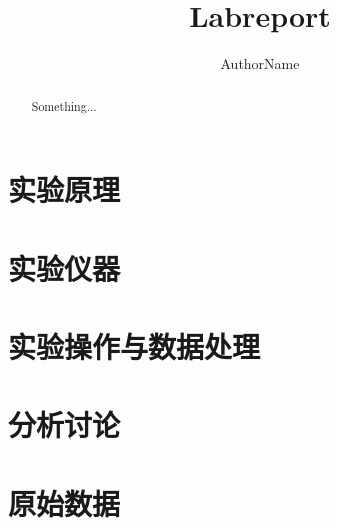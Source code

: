 \documentclass[UTF-8]{ctexart}
\title{Labreport}
\author{AuthorName}
\begin{document}
\maketitle
\tableofcontents
\begin{abstract}
	Something...
\end{abstract}

\section{实验原理}

\section{实验仪器}

\section{实验操作与数据处理}

\section{分析讨论}

\section*{原始数据}
\end{document}

